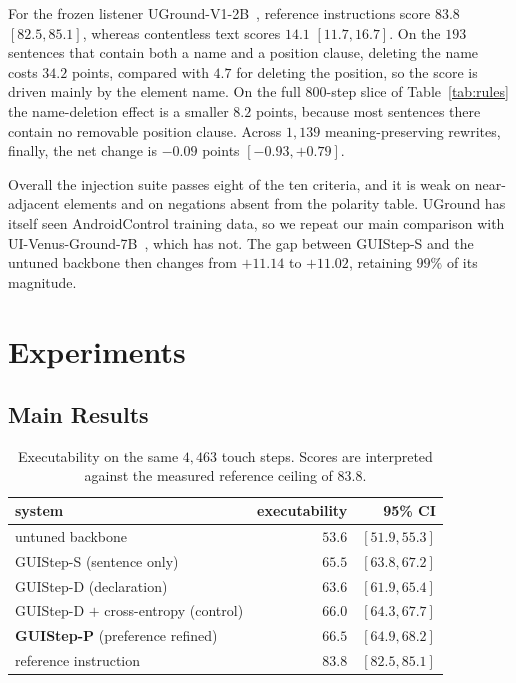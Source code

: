 \documentclass[runningheads,a4paper]{llncs}
\begin{document}
For the frozen listener UGround-V1-2B~\cite{uground}, reference instructions score $83.8$
$[82.5,85.1]$, whereas contentless text scores $14.1$ $[11.7,16.7]$. On the $193$ sentences that
contain both a name and a position clause, deleting the name costs $34.2$ points, compared with
$4.7$ for deleting the position, so the score is driven mainly by the element name. On the full
$800$-step slice of Table~\ref{tab:rules} the name-deletion effect is a smaller $8.2$ points,
because most sentences there contain no removable position clause. Across $1{,}139$
meaning-preserving rewrites, finally, the net change is $-0.09$ points $[-0.93,+0.79]$.

Overall the injection suite passes eight of the ten criteria, and it is weak on near-adjacent
elements and on negations absent from the polarity table. UGround has itself seen AndroidControl
training data, so we repeat our main comparison with UI-Venus-Ground-7B~\cite{uivenus}, which has
not. The gap between GUIStep-S and the untuned backbone then changes from $+11.14$ to $+11.02$,
retaining $99\%$ of its magnitude.

\section{Experiments}
\label{sec:results}

\subsection{Main Results}

\begin{table}[t]
\centering
\caption{Executability on the same $4{,}463$ touch steps. Scores are interpreted against the
measured reference ceiling of $83.8$.}
\label{tab:main}
\begin{tabular}{lrr}
\toprule
system & executability & 95\% CI\\
\midrule
untuned backbone & $53.6$ & $[51.9,55.3]$\\
GUIStep-S (sentence only) & $65.5$ & $[63.8,67.2]$\\
GUIStep-D (declaration) & $63.6$ & $[61.9,65.4]$\\
GUIStep-D $+$ cross-entropy (control) & $66.0$ & $[64.3,67.7]$\\
\textbf{GUIStep-P} (preference refined) & $\mathbf{66.5}$ & $[64.9,68.2]$\\
\midrule
reference instruction & $83.8$ & $[82.5,85.1]$\\
\bottomrule
\end{tabular}
\end{table}
\end{document}
